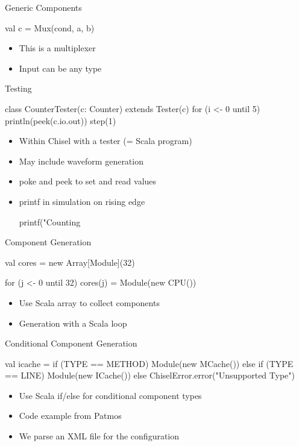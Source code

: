 \documentclass[xcolor=pdflatex,dvipsnames,table]{beamer}
\begin{document}
\begin{frame}[fragile]{Generic Components}
\begin{chisel}
val c = Mux(cond, a, b)
\end{chisel}
\begin{itemize}
\item This is a multiplexer
\item Input can be any type
\end{itemize}
\end{frame}

\begin{frame}[fragile]{Testing}
\begin{chisel}
class CounterTester(c: Counter) extends Tester(c) {
  for (i <- 0 until 5) {
    println(peek(c.io.out))
    step(1)
  }
}
\end{chisel}
\begin{itemize}
\item Within Chisel with a tester (= Scala program)
\item May include waveform generation
\item poke and peek to set and read values
\item printf in simulation on rising edge
\begin{chisel}
printf("Counting %
\end{chisel}
\end{itemize}
\end{frame}

\begin{frame}[fragile]{Component Generation}
\begin{chisel}
val cores = new Array[Module](32)

for (j <- 0 until 32)
  cores(j) = Module(new CPU())
\end{chisel}
\begin{itemize}
\item Use Scala array to collect components
\item Generation with a Scala loop
\end{itemize}
\end{frame}

\begin{frame}[fragile]{Conditional Component Generation}
\begin{chisel}
val icache =
  if (TYPE == METHOD)
    Module(new MCache())
  else if (TYPE == LINE)
    Module(new ICache())
  else
    ChiselError.error("Unsupported Type")
\end{chisel}
\begin{itemize}
\item Use Scala if/else for conditional component types
\item Code example from Patmos
\item We parse an XML file for the configuration
\end{itemize}
\end{frame}
\end{document}
